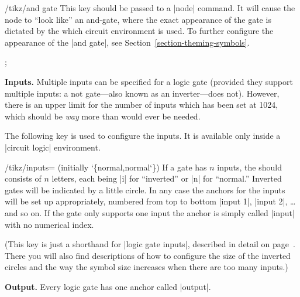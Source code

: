 \begin{key}{/tikz/and gate}
  This key should be passed to a |node| command. It will cause the
  node to ``look like'' an and-gate, where the exact appearance of the
  gate is dictated by the which circuit environment is used.   To
  further configure the appearance of the |and gate|, see 
  Section~\ref{section-theming-symbols}.

\begin{codeexample}[]
 ;    
\end{codeexample}
\begin{codeexample}[]
\end{codeexample}

  \medskip\textbf{Inputs.}
  Multiple inputs can be specified for a logic gate (provided they
  support multiple inputs: a not gate---also known as an
  inverter---does not). However, there is an upper limit for the
  number of inputs which has been set at 1024, which should be \emph{way} 
  more than would ever be needed.

  The following key is used to configure the inputs. It is available
  only inside a |circuit logic| environment.
 
  \begin{key}{/tikz/inputs= (initially \char`\{normal,normal\char`\})}
    If a gate has $n$ inputs, the  should consists of
    $n$ letters, each being |i| for ``inverted'' or |n| for
    ``normal.'' Inverted gates will be indicated by a little
    circle. In any case the anchors for the inputs will be set  
    up appropriately, numbered from top to bottom |input 1|, |input 2|,
    \ldots and so on. If the gate only supports one input the anchor
    is simply called |input| with no numerical index.
\begin{codeexample}[]
\end{codeexample} 
  \end{key}

  (This key is just a shorthand for |logic gate inputs|, described
  in detail on page~\pageref{logic-gate-inputs}. There you will also
  find descriptions of how to configure the size of the inverted
  circles and the way the symbol size increases when there are too
  many inputs.)
  
  \textbf{Output.}
  Every logic gate has one anchor called |output|.
\end{key}




